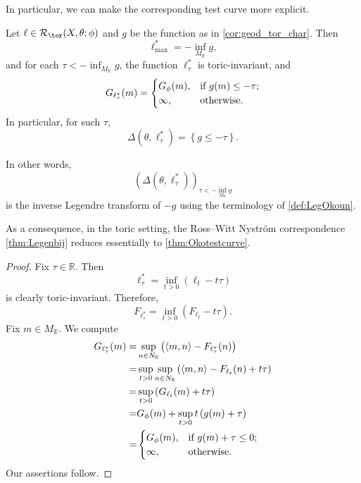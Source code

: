 In particular, we can make the corresponding test curve more explicit.
\begin{corollary}\label{cor:RWN_toric}
    Let $\ell\in \mathcal{R}_{\tor}(X,\theta;\phi)$ and $g$ be the function as in \cref{cor:geod_tor_char}. Then
    \begin{equation}\label{eq:ellmax_temp1}
    \ell^*_{\max}=-\inf_{M_{\mathbb{R}}} g,
    \end{equation}
    and for each $\tau<-\inf_{M_{\mathbb{R}}} g$, the function $\ell^*_{\tau}$ is toric-invariant, and
    \[
    G_{\ell^*_{\tau}}(m)=\begin{cases}
        G_{\phi}(m),&\textup{if }g(m)\leq -\tau;\\
        \infty,&\textup{otherwise}.
    \end{cases}
    \]
    In particular, for such $\tau$,
    \[
    \Delta\left(\theta, \ell^*_{\tau}\right)=\left\{g\leq -\tau\right\}.
    \]
\end{corollary}
In other words,
\[
\left(\Delta\left(\theta, \ell^*_{\tau}\right)\right)_{\tau<-\inf_{M_{\mathbb{R}}} g}
\]
is the inverse Legendre transform of $-g$ using the terminology of \cref{def:LegOkoun}.

As a consequence, in the toric setting, the Ross--Witt Nyström correspondence \cref{thm:Legenbij} reduces essentially to \cref{thm:Okotestcurve}.
\begin{proof}
    Fix $\tau\in \mathbb{R}$. Then
    \[
    \ell^*_{\tau}=\inf_{t>0} \left(\ell_t-t\tau\right)
    \]
    is clearly toric-invariant.
    Therefore,
    \[
    F_{\ell^*_{\tau}}=\inf_{t>0} \left(F_{\ell_t}-t\tau\right).
    \]
    Fix $m\in M_{\mathbb{R}}$. We compute
    \[
    \begin{aligned}
    G_{\ell^*_{\tau}}(m)=& \sup_{n\in N_{\mathbb{R}}}\left( \langle m, n\rangle -F_{\ell^*_{\tau}}(n) \right)\\
    =& \sup_{t>0}\sup_{n\in N_{\mathbb{R}}}\left( \langle m, n\rangle - F_{\ell_t}(n) +t\tau\right)\\
    =&\sup_{t>0} \left(G_{\ell_t}(m)+t\tau \right)\\
    =& G_{\phi}(m)+\sup_{t>0} t\left(g(m)+\tau\right)\\
    =& \begin{cases}
        G_{\phi}(m),&\textup{if }g(m)+\tau\leq 0;\\
        \infty,&\textup{otherwise}.
    \end{cases}
    \end{aligned}
    \]
    Our assertions follow.
\end{proof}


